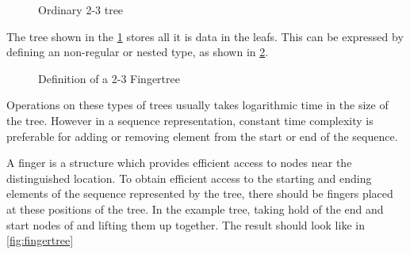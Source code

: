 \begin{figure}[!h]
\centering
{}
\caption{Ordinary 2-3 tree
\label{fig:2-3tree}}
\end{figure}

The tree shown in the \cref{fig:2-3tree} stores all it is data in the leafs.
This can be expressed by defining an non-regular or nested type, as shown in
\cref{fig:2-3Fingertree}.

\begin{figure}[h!]

\caption{Definition of a 2-3 Fingertree \label{fig:2-3Fingertree}}
\end{figure}

Operations on these types of trees usually takes logarithmic time in the size of
the tree. However in a sequence representation, constant time complexity is
preferable for adding or removing element from the start or end of the sequence.

A finger is a structure which provides efficient access to nodes near the
distinguished location. To obtain efficient access to the starting and ending
elements of the sequence represented by the tree, there should be fingers placed
at these positions of the tree. In the example tree, taking hold of the end and start
nodes of and lifting them up together. The result should look like in
\cref{fig:fingertree}

